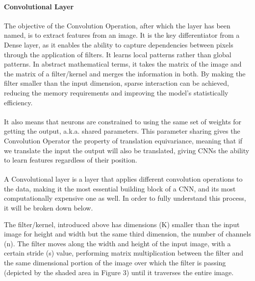 \documentclass{article}
\begin{document}
\paragraph{Convolutional Layer}
\paragraph{}
The objective of the Convolution Operation, after which the layer has been named, is to extract features from an image. It is the key differentiator from a Dense layer, as it enables the ability to capture dependencies between pixels through the application of filters. It learns local patterns rather than global patterns.
In abstract mathematical terms, it takes the matrix of the image and the matrix of a filter/kernel and merges the information in both. By making the filter smaller than the input dimension, sparse interaction can be achieved, reducing the memory requirements and improving the model's statistically efficiency.

\paragraph{}
It also means that neurons are constrained to using the same set of weights for getting the output, a.k.a. shared parameters. This parameter sharing gives the Convolution Operator the property of translation equivariance, meaning that if we translate the input the output will also be translated, giving CNNs the ability to learn features regardless of their position.
\paragraph{}
A Convolutional layer is a layer that applies different convolution operations to the data, making it the most essential building block of a CNN, and its most computationally expensive one as well. In order to fully understand this process, it will be broken down below.

The filter/kernel, introduced above has dimensions (K) smaller than the input image for height and width but the same third dimension, the number of channels (n). The filter moves along the width and height of the input image, with a certain stride (s) value, performing matrix multiplication between the filter and the same dimensional portion of the image over which the filter is passing (depicted by the shaded area in Figure 3) until it traverses the entire image.
\end{document}
